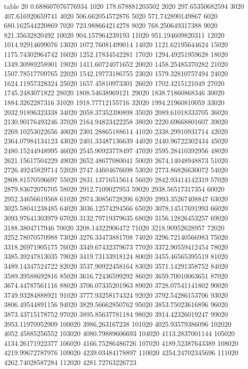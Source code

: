 table {%
20 0.688607076776934
1020 178.678881203502
2020 297.65350682594
3020 407.616920659741
4020 506.662054572876
5020 571.742890149867
6020 680.162544220869
7020 723.988664214278
8020 768.250649317388
9020 821.35632820492
10020 904.157964239193
11020 951.194609820311
12020 1014.92914699076
13020 1072.76081499014
14020 1121.62195644624
15020 1175.74302964742
16020 1252.17834542281
17020 1294.49251959628
18020 1349.30989258901
19020 1411.60724071652
20020 1458.25485370282
21020 1507.78517709765
22020 1542.19773186755
23020 1579.32810757494
24020 1624.11957328324
25020 1657.45810973301
26020 1702.4215121049
27020 1745.2483071822
28020 1808.54638969121
29020 1838.71860868346
30020 1884.3262287316
31020 1918.77712155716
32020 1994.21960810059
33020 2032.91896323338
34020 2058.37352390898
35020 2089.61018333705
36020 2130.90176493246
37020 2164.94823422258
38020 2220.69668801607
39020 2269.10253022656
40020 2301.28865188614
41020 2338.29910931714
42020 2364.07984134123
43020 2401.33487136639
44020 2440.96722302434
45020 2480.15244948995
46020 2545.90923778497
47020 2595.28410392956
48020 2621.15617504229
49020 2652.48677080041
50020 2674.14048948873
51020 2726.49245829714
52020 2747.44604676698
53020 2773.86826630072
54020 2808.81570596697
55020 2831.13716515614
56020 2842.93414142319
57020 2879.83672076705
58020 2912.7109027953
59020 2938.56517317354
60020 2952.34656619568
61020 2974.30856728206
62020 2993.35267408847
63020 3025.58041238485
64020 3036.12574294566
65020 3078.14517691993
66020 3093.97641303979
67020 3132.79719379635
68020 3156.12826453257
69020 3188.3804717946
70020 3208.14322906472
71020 3218.90952628957
72020 3252.78070570988
73020 3276.33473881708
74020 3296.72140566983
75020 3318.26971905175
76020 3349.67432379673
77020 3372.90559412454
78020 3385.39247813035
79020 3419.73133918124
80020 3455.46565395519
81020 3489.14347524722
82020 3537.90922458164
83020 3571.14291358752
84020 3589.39588692816
85020 3616.72436599292
86020 3659.70010063651
87020 3674.44787561116
88020 3706.07335201963
89020 3728.07541141802
90020 3749.93284888921
91020 3777.93258174324
92020 3792.54286153706
93020 3806.49544891156
94020 3829.56662850762
95020 3853.75023616896
96020 3873.43715178752
97020 3895.85637781184
98020 3914.42326019247
99020 3953.11970952909
100020 3986.263167238
101020 4025.93579386096
102020 4052.45885256552
103020 4080.79889606693
104020 4113.2837001144
105020 4134.26171922377
106020 4166.75286486726
107020 4189.52387643389
108020 4219.99672787976
109020 4239.03484178897
110020 4254.24702345696
111020 4262.74028587284
112020 4281.72763226723
}
